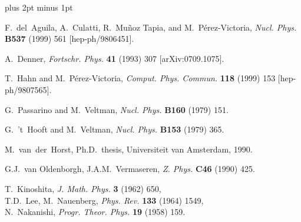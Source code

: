 \documentclass[twoside,12pt]{report}
\begin{document}
\begin{flushleft}
\begin{thebibliography}{999}

\itemsep 2pt plus 2pt minus 1pt
\frenchspacing

F.~del~Aguila, A.~Culatti, R.~Mu\~noz Tapia, and M.~P\'erez-Victoria,
\textsl{Nucl. Phys.} \textbf{B537} (1999) 561
[hep-ph/9806451].

A.~Denner, \textsl{Fortschr. Phys.} \textbf{41} (1993) 307
[arXiv:0709.1075].

T.~Hahn and M.~P\'erez-Victoria,
\textsl{Comput. Phys. Commun.} \textbf{118} (1999) 153
[hep-ph/9807565].

G.~Passarino and M.~Veltman,
\textsl{Nucl. Phys.} \textbf{B160} (1979) 151.

G.~'t~Hooft and M.~Veltman,
\textsl{Nucl. Phys.} \textbf{B153} (1979) 365.

M.~van~der~Horst, Ph.D.\ thesis, Universiteit van Amsterdam, 1990.

G.J.~van Oldenborgh, J.A.M.~Vermaseren,
\textsl{Z. Phys.} \textbf{C46} (1990) 425.

T.~Kinoshita, \textsl{J. Math. Phys.} \textbf{3} (1962) 650, \\
T.D.~Lee, M.~Nauenberg, \textsl{Phys. Rev.} \textbf{133} (1964) 1549, \\
N.~Nakanishi, \textsl{Progr. Theor. Phys.} \textbf{19} (1958) 159.

\end{thebibliography}
\end{flushleft}


\printindex
\end{document}

